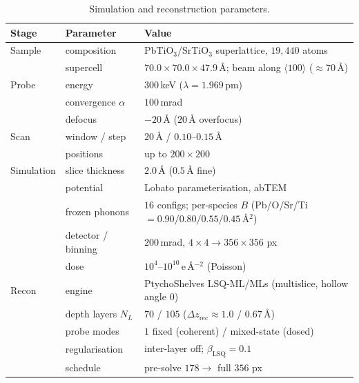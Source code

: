 \begin{table}[t]
  \centering
  \small
  \begin{tabular}{@{}lll@{}}
    \toprule
    Stage & Parameter & Value \\
    \midrule
    Sample     & composition        & PbTiO$_3$/SrTiO$_3$ superlattice, $19{,}440$ atoms \\
               & supercell          & $70.0\times70.0\times47.9$\,\AA; beam along $\langle100\rangle$ ($\approx70$\,\AA) \\
    \addlinespace
    Probe      & energy             & $300$\,keV ($\lambda=1.969\,$pm) \\
               & convergence $\alpha$ & $100$\,mrad \\
               & defocus            & $-20$\,\AA{} ($20$\,\AA{} overfocus) \\
    \addlinespace
    Scan       & window / step      & $20$\,\AA{} / $0.10$--$0.15$\,\AA{} \\
               & positions          & up to $200\times200$ \\
    \addlinespace
    Simulation & slice thickness    & $2.0$\,\AA{} ($0.5$\,\AA{} fine) \\
               & potential          & Lobato parameterisation, abTEM \\
               & frozen phonons     & $16$ configs; per-species $B$ (Pb/O/Sr/Ti $=0.90/0.80/0.55/0.45$\,\AA$^2$) \\
               & detector / binning & $200$\,mrad, $4\times4\rightarrow356\times356$ px \\
               & dose               & $10^{4}$--$10^{10}$\,e\,\AA$^{-2}$ (Poisson) \\
    \addlinespace
    Recon      & engine             & PtychoShelves LSQ-ML/MLs (multislice, hollow angle $0$) \\
               & depth layers $N_L$ & $70$ / $105$ ($\Delta z_\mathrm{rec}\approx1.0$ / $0.67$\,\AA) \\
               & probe modes        & $1$ fixed (coherent) / mixed-state (dosed) \\
               & regularisation     & inter-layer off; $\beta_{\mathrm{LSQ}}=0.1$ \\
               & schedule           & pre-solve $178\rightarrow$ full $356$ px \\
    \bottomrule
  \end{tabular}
  \caption{Simulation and reconstruction parameters.}
  \label{tab:params}
\end{table}
